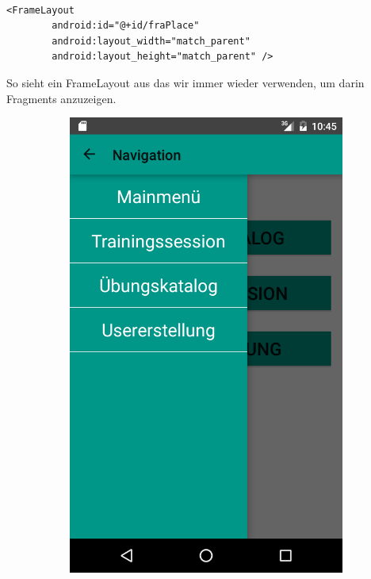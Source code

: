\documentclass[FIPLY_base.tex]{subfiles}
\begin{document}
\ \\
\begin{lstlisting}
<FrameLayout
        android:id="@+id/fraPlace"
        android:layout_width="match_parent"
        android:layout_height="match_parent" />
\end{lstlisting}
So sieht ein FrameLayout aus das wir immer wieder verwenden, um darin Fragments anzuzeigen.

\newpage
\begin{figure}[H] %
	\begin{subfigure}[h]{0.3\textwidth}
	\includegraphics[scale=0.20]{img/NavigationDrawer}

\end{subfigure}
\end{figure}
\end{document}
